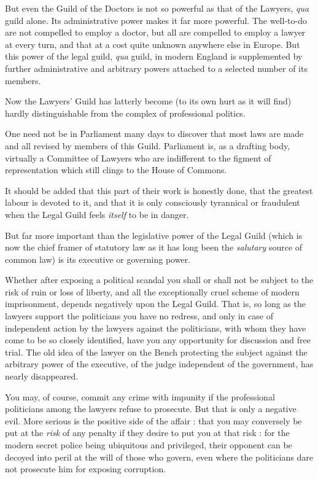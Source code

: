 \documentclass{book}
\begin{document}
But even the Guild of the Doctors is not so powerful as that of the Lawyers, \emph{qua} guild alone. Its administrative power makes it far more powerful. The well-to-do are not compelled to employ a doctor, but all are compelled to employ a lawyer at every turn, and that at a cost quite unknown anywhere else in Europe. But this power of the legal guild, \emph{qua} guild, in modern England is supplemented by further administrative and arbitrary powers attached to a selected number of its members.

Now the Lawyers’ Guild has latterly become (to its own hurt as it will find) hardly distinguishable from the complex of professional politics.

One need not be in Parliament many days to discover that most laws are made and all revised by members of this Guild. Parliament is, as a drafting body, virtually a Committee of Lawyers who are indifferent to the figment of representation which still clings to the House of Commons.

It should be added that this part of their work is honestly done, that the greatest labour is devoted to it, and that it is only consciously tyrannical or fraudulent when the Legal Guild feels \emph{itself} to be in danger.

But far more important than the legislative power of the Legal Guild (which is now the chief framer of statutory law as it has long been the \emph{salutary} source of common law) is its executive or governing power.

Whether after exposing a political scandal you shall or shall not be subject to the risk of ruin or loss of liberty, and all the exceptionally cruel scheme of modern imprisonment, depends negatively upon the Legal Guild. That is, so long as the lawyers support the politicians you have no redress, and only in case of independent action by the lawyers against the politicians, with whom they have come to be so closely identified, have you any opportunity for discussion and free trial. The old idea of the lawyer on the Bench protecting the subject against the arbitrary power of the executive, of the judge independent of the government, has nearly disappeared.

You may, of course, commit any crime with impunity if the professional politicians among the lawyers refuse to prosecute. But that is only a negative evil. More serious is the positive side of the affair : that you may conversely be put at the \emph{risk} of any penalty if they desire to put you at that risk : for the modern secret police being ubiquitous and privileged, their opponent can be decoyed into peril at the will of those who govern, even where the politicians dare not prosecute him for exposing corruption.
\end{document}
